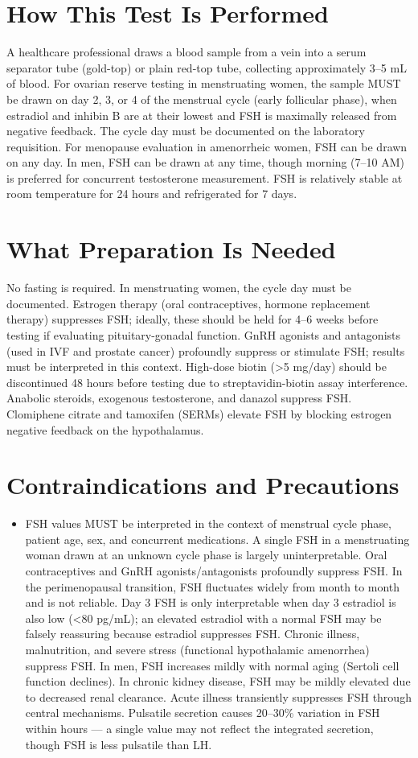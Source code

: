 \section*{How This Test Is Performed}
A healthcare professional draws a blood sample from a vein into a serum separator tube (gold-top) or plain red-top tube, collecting approximately 3--5 mL of blood. For ovarian reserve testing in menstruating women, the sample MUST be drawn on day 2, 3, or 4 of the menstrual cycle (early follicular phase), when estradiol and inhibin B are at their lowest and FSH is maximally released from negative feedback. The cycle day must be documented on the laboratory requisition. For menopause evaluation in amenorrheic women, FSH can be drawn on any day. In men, FSH can be drawn at any time, though morning (7--10 AM) is preferred for concurrent testosterone measurement. FSH is relatively stable at room temperature for 24 hours and refrigerated for 7 days.

\section*{What Preparation Is Needed}
No fasting is required. In menstruating women, the cycle day must be documented. Estrogen therapy (oral contraceptives, hormone replacement therapy) suppresses FSH; ideally, these should be held for 4--6 weeks before testing if evaluating pituitary-gonadal function. GnRH agonists and antagonists (used in IVF and prostate cancer) profoundly suppress or stimulate FSH; results must be interpreted in this context. High-dose biotin (>5 mg/day) should be discontinued 48 hours before testing due to streptavidin-biotin assay interference. Anabolic steroids, exogenous testosterone, and danazol suppress FSH. Clomiphene citrate and tamoxifen (SERMs) elevate FSH by blocking estrogen negative feedback on the hypothalamus.

\section*{Contraindications and Precautions}
\begin{itemize}
  \item FSH values MUST be interpreted in the context of menstrual cycle phase, patient age, sex, and concurrent medications. A single FSH in a menstruating woman drawn at an unknown cycle phase is largely uninterpretable. Oral contraceptives and GnRH agonists/antagonists profoundly suppress FSH. In the perimenopausal transition, FSH fluctuates widely from month to month and is not reliable. Day 3 FSH is only interpretable when day 3 estradiol is also low (<80 pg/mL); an elevated estradiol with a normal FSH may be falsely reassuring because estradiol suppresses FSH. Chronic illness, malnutrition, and severe stress (functional hypothalamic amenorrhea) suppress FSH. In men, FSH increases mildly with normal aging (Sertoli cell function declines). In chronic kidney disease, FSH may be mildly elevated due to decreased renal clearance. Acute illness transiently suppresses FSH through central mechanisms. Pulsatile secretion causes 20--30\% variation in FSH within hours --- a single value may not reflect the integrated secretion, though FSH is less pulsatile than LH.
\end{itemize}
